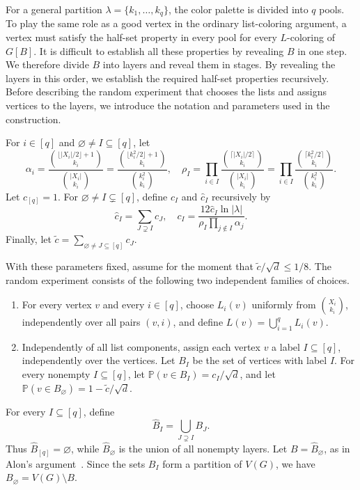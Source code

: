 \documentclass[10pt,a4paper]{amsart}
\numberwithin{equation}{section}
\newcommand{\Prob}{\mathbb{P}}
\begin{document}
For a general partition $\lambda=\{k_1,\ldots,k_q\}$, the color palette is
divided into $q$ pools. To play the same role as a good vertex in the
ordinary list-coloring argument, a vertex must satisfy the half-set property
in every pool for every $L$-coloring of $G[B]$. It is difficult to establish
all these properties by revealing $B$ in one step. We therefore divide $B$
into layers and reveal them in stages. By revealing the layers in this order,
we establish the required half-set properties recursively. Before describing the random experiment that chooses the lists and assigns
vertices to the layers, we introduce the notation and parameters used in the
construction.



For $i \in [q]$ and $\varnothing \ne I \subseteq [q]$, let
\[
 \alpha_i =
 \frac{\binom{\lfloor |X_i|/2\rfloor + 1}{k_i}}
 {\binom{|X_i|}{k_i}}=\frac{\binom{\lfloor k_i^2/2\rfloor + 1}{k_i}}
 {\binom{k_i^2}{k_i}},
 \quad
 \rho_I =
 \prod_{i \in I}
 \frac{\binom{\lceil |X_i|/2\rceil}{k_i}}
 {\binom{|X_i|}{k_i}}=\prod_{i \in I}
 \frac{\binom{\lceil k_i^2 /2\rceil}{k_i}}
 {\binom{k_i^2}{k_i}}.
\]
Let $c_{[q]}=1$. For $\varnothing\ne I\subsetneq[q]$, define $c_I$ and
$\hat{c}_I$ recursively by
\begin{equation}\label{eq:c-recursion}
 \hat{c}_{I} = \sum_{J \supsetneq I}c_J,
 \quad
 c_I = \frac{12\hat{c}_{I}\ln |\lambda|}
 {\rho_I\prod_{j \notin I}\alpha_j}.
\end{equation}
Finally, let
$\widetilde{c} = \sum_{\varnothing \ne J \subseteq [q]}c_J$.

With these parameters fixed, assume for the moment that
$\widetilde{c}/\sqrt{d} \leq 1/8$.
The random experiment consists of the following two independent families of
choices.
\begin{enumerate}
\item For every vertex $v$ and every $i \in [q]$, choose $L_i(v)$ uniformly
from $\binom{X_i}{k_i}$, independently over all pairs $(v,i)$, and define
$L(v)=\bigcup_{i=1}^q L_i(v)$.
\item Independently of all list components, assign each vertex $v$ a label
$I\subseteq[q]$, independently over the vertices. Let $B_I$ be the set of
vertices with label $I$. For every nonempty $I\subseteq[q]$, let
$\Prob(v\in B_I)=c_I/\sqrt d$, and let
$\Prob(v\in B_\varnothing)=1-\widetilde c/\sqrt d$.
\end{enumerate}
For every $I \subseteq [q]$, define
\[
 \hat{B}_{I} = \bigcup_{J \supsetneq I}B_J.
\]
Thus $\hat{B}_{[q]}=\varnothing$, while $\hat{B}_{\varnothing}$ is the union
of all nonempty layers. Let $B=\hat{B}_{\varnothing}$, as in Alon's
argument~\cite{Alon2000}. Since the sets $B_I$ form a partition of $V(G)$,
we have $B_\varnothing=V(G)\setminus B$.
\end{document}
